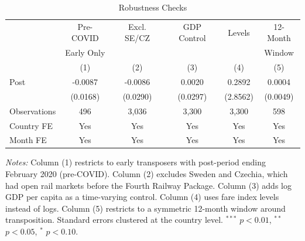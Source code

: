 \begin{table}[htbp]
\centering
\caption{Robustness Checks}
\label{tab:robustness}
\begin{tabular}{lccccc}
\hline\hline
 & Pre-COVID & Excl. SE/CZ & GDP Control & Levels & 12-Month \\
 & Early Only & & & & Window \\
 & (1) & (2) & (3) & (4) & (5) \\
\hline
Post & -0.0087 & -0.0086 & 0.0020 & 0.2892 & 0.0004 \\
  & (0.0168) & (0.0290) & (0.0297) & (2.8562) & (0.0049) \\
\hline
Observations & 496 & 3,036 & 3,300 & 3,300 & 598 \\
Country FE & Yes & Yes & Yes & Yes & Yes \\
Month FE & Yes & Yes & Yes & Yes & Yes \\
\hline\hline
\end{tabular}
\begin{tablenotes}[flushleft]\footnotesize
\item \textit{Notes:} Column (1) restricts to early transposers with post-period ending February 2020 (pre-COVID). Column (2) excludes Sweden and Czechia, which had open rail markets before the Fourth Railway Package. Column (3) adds log GDP per capita as a time-varying control. Column (4) uses fare index levels instead of logs. Column (5) restricts to a symmetric 12-month window around transposition. Standard errors clustered at the country level. $^{***}$ $p<0.01$, $^{**}$ $p<0.05$, $^{*}$ $p<0.10$.
\end{tablenotes}
\end{table}
